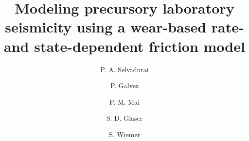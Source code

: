 \documentclass[preprint,1p, 10pt,authoryear]{elsarticle}
\begin{document}
\begin{frontmatter}



\title{Modeling precursory laboratory seismicity using a wear-based rate- and state-dependent friction model}

 \author[1]{P. A. Selvadurai }
\author[2]{P. Galvez}
\author[2]{P. M. Mai}
\author[3]{S. D. Glaser} 
\author[1]{S. Wiemer} 



\address[1]{Swiss Seismological Service, ETH Zurich, Zurich, Switzerland}
\address[2]{King Abdullah University of Science and Technology, Thuwal, Saudi Arabia}
\address[3]{Civil and Environmental Engineering, University of California, Berkeley, California, USA}




\end{frontmatter}
\end{document}
